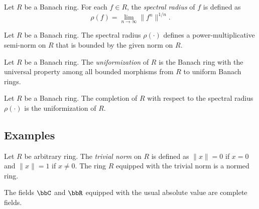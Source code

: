     \begin{definition}\label{def:spectral_radius_on_Banach_rings}
        Let \(R\) be a Banach ring.
        For each \(f \in R\), the \emph{spectral radius} of \(f\) is defined as
        \[
            \rho(f) = \lim_{n \to \infty} \|f^n\|^{1/n}.
        \]
    \end{definition}

    \begin{proposition}\label{prop:spectral_radius_defines_a_power-multiplicative_semi-norm}
        Let \(R\) be a Banach ring.
        The spectral radius \(\rho(\cdot)\) defines a power-multiplicative semi-norm on \(R\) that is bounded by the given norm on \(R\).
    \end{proposition}

    \begin{definition}\label{def:uniformization_of_banach_rings}
        Let \(R\) be a Banach ring.
        The \emph{uniformization} of \(R\) is the Banach ring with the universal property among all bounded morphisms from \(R\) to uniform Banach rings.
    \end{definition}

    \begin{proposition}\label{prop:the_uniformization_of_banach_rings_given_by_spectral_radius}
        Let \(R\) be a Banach ring.
        The completion of \(R\) with respect to the spectral radius \(\rho(\cdot)\) is the uniformization of \(R\).
    \end{proposition}



\subsection{Examples}

    \begin{example}\label{eg:trivial_normed_rings}
        Let \(R\) be arbitrary ring.
        The \emph{trivial norm} on \(R\) is defined as \(\|x\| = 0\) if \(x = 0\) and \(\|x\| = 1\) if \(x \neq 0\).
        The ring \(R\) equipped with the trivial norm is a normed ring.
    \end{example}

    \begin{example}\label{eg:C_and_R_as_complete_fields}
        The fields \(\bbC\) and \(\bbR\) equipped with the usual absolute value are complete fields.
    \end{example}

